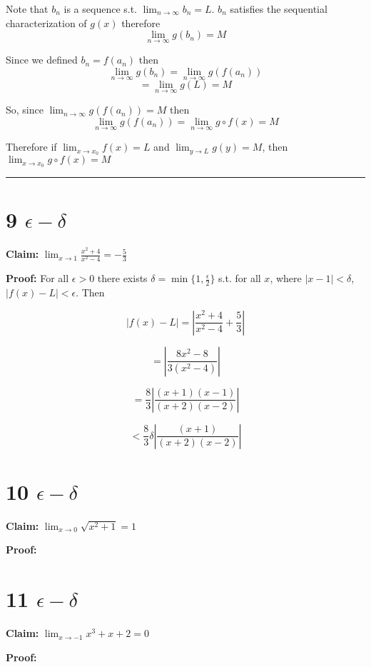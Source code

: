 \documentclass[10pt,letterpaper]{article}
\newcommand\ds{\displaystyle}
\newcommand\qedsym{\hfill \rule{2mm}{2mm}}
\begin{document}
Note that $b_n$ is a sequence s.t. $\ds\lim_{n\to\infty}b_n=L$. $b_n$ satisfies the sequential characterization of $g(x)$ therefore
\[\lim_{n\to\infty} g(b_n) = M\]

Since we defined $b_n = f(a_n)$ then
\[\lim_{n\to\infty} g(b_n) = \lim_{n\to\infty} g(f(a_n))\]
\[= \lim_{n\to\infty} g(L) = M\]

So, since $\lim_{n\to\infty} g(f(a_n)) = M$ then
\[\lim_{n\to\infty} g(f(a_n)) = \lim_{n\to\infty} g\circ f(x) = M\]

Therefore if $\ds\lim_{x\to x_0} f(x) = L$ and $\ds\lim_{y\to L} g(y) = M$, then $\ds\lim_{x\to x_0} g \circ f(x) = M$

\qedsym

\section*{9 $\epsilon - \delta$}

\textbf{Claim:} $\ds\lim_{x\to 1}\frac{x^2+4}{x^2-4} = -\frac{5}{3}$

\medskip

\textbf{Proof:} For all $\epsilon > 0$ there exists $\delta = \min\{1, \frac{\epsilon}{2}\}$ s.t. for all $x$, where $|x-1|<\delta$, $|f(x) - L| < \epsilon$. Then

\[|f(x) - L| = \left|\frac{x^2+4}{x^2-4}+\frac{5}{3}\right|\]

\[=\left|\frac{8x^2-8}{3(x^2-4)}\right|\]

\[=\frac{8}{3}\left|\frac{(x+1)(x-1)}{(x+2)(x-2)}\right|\]

\[<\frac{8}{3}\delta\left|\frac{(x+1)}{(x+2)(x-2)}\right|\]


\section*{10 $\epsilon - \delta$}

\textbf{Claim:} $\ds\lim_{x\to 0} \sqrt{x^2 + 1} = 1$

\medskip

\textbf{Proof:}

\section*{11 $\epsilon - \delta$}

\textbf{Claim:} $\ds\lim_{x\to -1} x^3 + x + 2 = 0$

\medskip

\textbf{Proof:}
\end{document}
